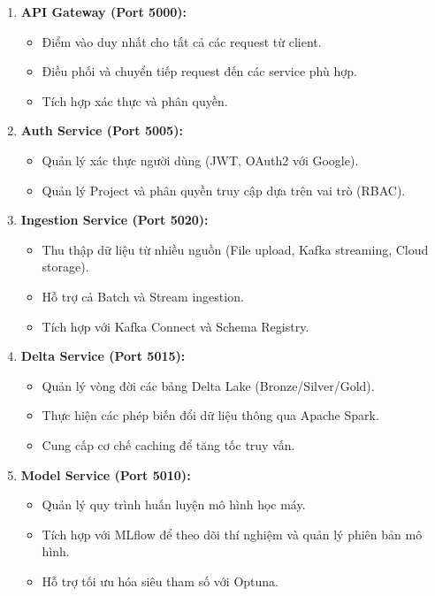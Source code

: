\begin{enumerate}
    \item \textbf{API Gateway (Port 5000):}
    \begin{itemize}
        \item Điểm vào duy nhất cho tất cả các request từ client.
        \item Điều phối và chuyển tiếp request đến các service phù hợp.
        \item Tích hợp xác thực và phân quyền.
    \end{itemize}

    \item \textbf{Auth Service (Port 5005):}
    \begin{itemize}
        \item Quản lý xác thực người dùng (JWT, OAuth2 với Google).
        \item Quản lý Project và phân quyền truy cập dựa trên vai trò (RBAC).
    \end{itemize}

    \item \textbf{Ingestion Service (Port 5020):}
    \begin{itemize}
        \item Thu thập dữ liệu từ nhiều nguồn (File upload, Kafka streaming, Cloud storage).
        \item Hỗ trợ cả Batch và Stream ingestion.
        \item Tích hợp với Kafka Connect và Schema Registry.
    \end{itemize}

    \item \textbf{Delta Service (Port 5015):}
    \begin{itemize}
        \item Quản lý vòng đời các bảng Delta Lake (Bronze/Silver/Gold).
        \item Thực hiện các phép biến đổi dữ liệu thông qua Apache Spark.
        \item Cung cấp cơ chế caching để tăng tốc truy vấn.
    \end{itemize}

    \item \textbf{Model Service (Port 5010):}
    \begin{itemize}
        \item Quản lý quy trình huấn luyện mô hình học máy.
        \item Tích hợp với MLflow để theo dõi thí nghiệm và quản lý phiên bản mô hình.
        \item Hỗ trợ tối ưu hóa siêu tham số với Optuna.
    \end{itemize}


\end{enumerate}
